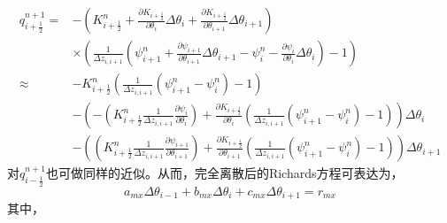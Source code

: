 \begin{equation}
\begin{split} 
q_{i+\frac{1}{2}}^{n+1} =&-\left(K_{i+\frac{1}{2}}^{n}+\frac{\partial K_{i+\frac{1}{2}}}{\partial \theta_{i}} \Delta \theta_{i} + \frac{\partial K_{i+\frac{1}{2}}}{\partial \theta_{i+1}} \Delta \theta_{i+1}\right)  \\
    & \times \left(\frac{1}{\Delta z_{i, i+1}}\left(\psi_{i+1}^{n}+\frac{\partial \psi_{i+1}}{\partial \theta_{i+1}} \Delta \theta_{i+1}-\psi_{i}^{n}-\frac{\partial \psi_{i}}
    {\partial \theta_{i}} \Delta \theta_{i}\right)-1\right) \\ 
    \approx & -K_{i+\frac{1}{2}}^{n}\left(\frac{1}{\Delta z_{i, i+1}}\left(\psi_{i+1}^{n}-\psi_{i}^{n}\right)-1\right) \\
    &-\left(-\left(K_{i+\frac{1}{2}}^{n} \frac{1}{\Delta z_{i, i+1}} \frac{\partial \psi_{i}}{\partial \theta_{i}}\right)+\frac{\partial K_{i+\frac{1}{2}}}{\partial 
     \theta_{i}}\left(\frac{1}{\Delta z_{i, i+1}}\left(\psi_{i+1}^{n}-\psi_{i}^{n}\right)-1\right)\right) \Delta \theta_{i} \\ 
    &-\left(\left(K_{i+\frac{1}{2}}^{n} \frac{1}{\Delta z_{i, i+1}} \frac{\partial \psi_{i+1}}{\partial \theta_{i+1}}\right)+\frac{\partial K_{i+\frac{1}{2}}}{\partial
      \theta_{i+1}}\left(\frac{1}{\Delta z_{i, i+1}}\left(\psi_{i+1}^{n}-\psi_{i}^{n}\right)-1\right)\right) \Delta \theta_{i+1} 
\end{split}
\end{equation}
对$q_{i-\frac{1}{2}}^{n+1}$也可做同样的近似。从而，完全离散后的Richards方程可表达为，
\begin{equation}
{a}_{{mx}} \Delta \theta_{i-1}+b_{m x} \Delta \theta_{i}+c_{m x} \Delta \theta_{i+1}=r_{m x}
\end{equation}
其中，
